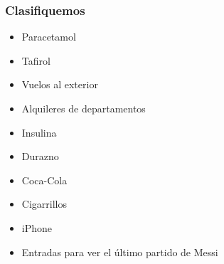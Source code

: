 \documentclass{beamer}
\begin{document}
\begin{frame}
\frametitle{Clasifiquemos}
\begin{itemize}
    \item Paracetamol
    \item Tafirol
    \item Vuelos al exterior
    \item Alquileres de departamentos
    \item Insulina
    \item Durazno
    \item Coca-Cola
    \item Cigarrillos
    \item iPhone
    \item Entradas para ver el último partido de Messi

    
\end{itemize}
\end{frame}
\end{document}

